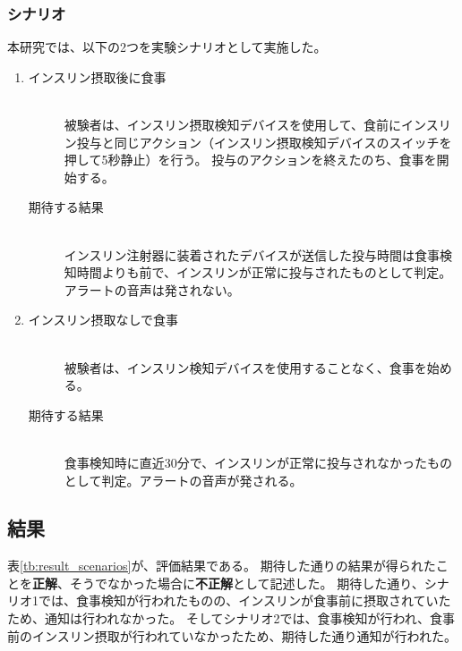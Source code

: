\subsubsection{シナリオ}

本研究では、以下の2つを実験シナリオとして実施した。

\begin{enumerate}
  \item
    \begin{description}
      \item[インスリン摂取後に食事]\mbox{}\\
        被験者は、インスリン摂取検知デバイスを使用して、食前にインスリン投与と同じアクション（インスリン摂取検知デバイスのスイッチを押して5秒静止）を行う。
        投与のアクションを終えたのち、食事を開始する。
    \end{description}
  \begin{description}
    \item[期待する結果]\mbox{}\\
      インスリン注射器に装着されたデバイスが送信した投与時間は食事検知時間よりも前で、インスリンが正常に投与されたものとして判定。アラートの音声は発されない。
  \end{description}
  \item
    \begin{description}
      \item[インスリン摂取なしで食事]\mbox{}\\
        被験者は、インスリン検知デバイスを使用することなく、食事を始める。
    \end{description}
    \begin{description}
      \item[期待する結果]\mbox{}\\
        食事検知時に直近30分で、インスリンが正常に投与されなかったものとして判定。アラートの音声が発される。
    \end{description}
\end{enumerate}

\subsection{結果}
表\ref{tb:result_scenarios}が、評価結果である。
期待した通りの結果が得られたことを\textbf{正解}、そうでなかった場合に\textbf{不正解}として記述した。
期待した通り、シナリオ1では、食事検知が行われたものの、インスリンが食事前に摂取されていたため、通知は行われなかった。
そしてシナリオ2では、食事検知が行われ、食事前のインスリン摂取が行われていなかったため、期待した通り通知が行われた。

